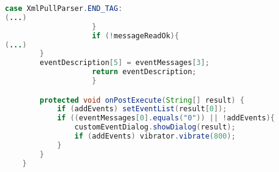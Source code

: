 \begin{lstlisting}[language=java, caption=Klasse Events]
                        case XmlPullParser.END_TAG:
(...)
                    }
                    if (!messageReadOk){
(...)
        }
        eventDescription[5] = eventMessages[3];
                    return eventDescription;
                    }

        protected void onPostExecute(String[] result) {
            if (addEvents) setEventList(result[0]);
            if ((eventMessages[0].equals("0")) || !addEvents){
                customEventDialog.showDialog(result);
                if (addEvents) vibrator.vibrate(800);
            }
        }
    }
\end{lstlisting}
